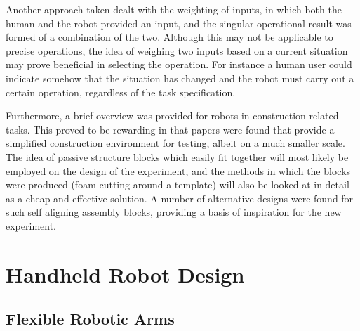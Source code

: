 \documentclass[11pt]{article}
\begin{document}
Another approach taken dealt with the weighting of inputs, in which both the human and the robot provided an input, and the singular operational result was formed of a combination of the two. Although this may not be applicable to precise operations, the idea of weighing two inputs based on a current situation may prove beneficial in selecting the operation. For instance a human user could indicate somehow that the situation has changed and the robot must carry out a certain operation, regardless of the task specification.

Furthermore, a brief overview was provided for robots in construction related tasks. This proved to be rewarding in that papers were found that provide a simplified construction environment for testing, albeit on a much smaller scale. The idea of passive structure blocks which easily fit together will most likely be employed on the design of the experiment, and the methods in which the blocks were produced (foam cutting around a template) will also be looked at in detail as a cheap and effective solution. A number of alternative designs were found for such self aligning assembly blocks, providing a basis of inspiration for the new experiment.


\pagebreak
\pagebreak

\section{Handheld Robot Design}
\subsection{Flexible Robotic Arms}
\end{document}
